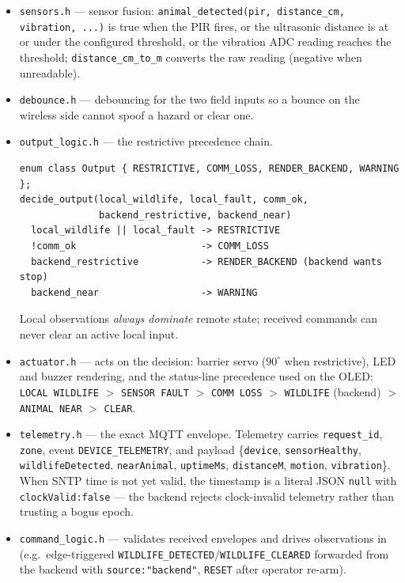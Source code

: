\begin{itemize}
  \item \texttt{sensors.h} --- sensor fusion:
        \texttt{animal\_detected(pir, distance\_cm, vibration, ...)} is
        true when the PIR fires, or the ultrasonic distance is at or under
        the configured threshold, or the vibration ADC reading reaches the
        threshold; \texttt{distance\_cm\_to\_m} converts the raw reading
        (negative when unreadable).
  \item \texttt{debounce.h} --- debouncing for the two field inputs so a
        bounce on the wireless side cannot spoof a hazard or clear one.
  \item \texttt{output\_logic.h} --- the restrictive precedence chain.
        \begin{verbatim}
enum class Output { RESTRICTIVE, COMM_LOSS, RENDER_BACKEND, WARNING };
decide_output(local_wildlife, local_fault, comm_ok,
              backend_restrictive, backend_near)
  local_wildlife || local_fault -> RESTRICTIVE
  !comm_ok                      -> COMM_LOSS
  backend_restrictive           -> RENDER_BACKEND (backend wants stop)
  backend_near                  -> WARNING
        \end{verbatim}
        Local observations \emph{always dominate} remote state; received
        commands can never clear an active local input.
  \item \texttt{actuator.h} --- acts on the decision: barrier servo
        ($90^\circ$ when restrictive), LED and buzzer rendering, and the
        status-line precedence used on the OLED:
        \texttt{LOCAL WILDLIFE} $>$ \texttt{SENSOR FAULT} $>$
        \texttt{COMM LOSS} $>$ \texttt{WILDLIFE} (backend) $>$
        \texttt{ANIMAL NEAR} $>$ \texttt{CLEAR}.
  \item \texttt{telemetry.h} --- the exact MQTT envelope. Telemetry
        carries \texttt{request\_id}, \texttt{zone}, event
        \texttt{DEVICE\_TELEMETRY}, and payload
        \{\texttt{device}, \texttt{sensorHealthy},
        \texttt{wildlifeDetected}, \texttt{nearAnimal},
        \texttt{uptimeMs}, \texttt{distanceM}, \texttt{motion},
        \texttt{vibration}\}. When SNTP time is not yet valid, the
        timestamp is a literal JSON \texttt{null} with
        \texttt{clockValid:false} --- the backend rejects clock-invalid
        telemetry rather than trusting a bogus epoch.
  \item \texttt{command\_logic.h} --- validates received envelopes and
        drives observations in (e.g.\ edge-triggered
        \texttt{WILDLIFE\_DETECTED}/\texttt{WILDLIFE\_CLEARED} forwarded
        from the backend with \texttt{source:"backend"}, \texttt{RESET}
        after operator re-arm).
\end{itemize}

